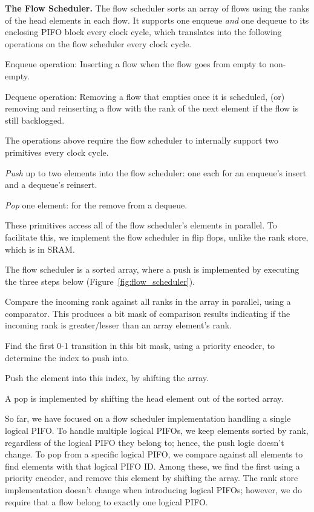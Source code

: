 \medskip
\noindent
\textbf{The Flow Scheduler.}
The flow scheduler sorts an array of flows using the ranks of the head elements
in each flow. It supports one enqueue {\em and} one dequeue to its enclosing
PIFO block every clock cycle, which translates into the following operations on
the flow scheduler every clock cycle.
\begin{CompactEnumerate}
  \item Enqueue operation: Inserting a flow when the flow goes from empty to
  non-empty.
\item Dequeue operation: Removing a flow that empties once it is
  scheduled, (or) removing and reinserting a flow with the rank of the
  next element if the flow is still backlogged.
\end{CompactEnumerate}

The operations above require the flow scheduler to internally support two
primitives every clock cycle.
\begin{CompactEnumerate}
\item {\em Push} up to two elements into the flow scheduler: one each for an
  enqueue's insert and a dequeue's reinsert.
\item {\em Pop} one element: for the remove from a dequeue.
\end{CompactEnumerate}
These primitives access all of the flow scheduler's elements in parallel. To
facilitate this, we implement the flow scheduler in flip flops, unlike the rank
store, which is in SRAM.

The flow scheduler is a sorted array, where a push is implemented by executing the
three steps below (Figure~\ref{fig:flow_scheduler}).
\begin{CompactEnumerate}
\item Compare the incoming rank against all ranks in the array in parallel, using a comparator.
  This produces a bit mask of comparison results indicating if the incoming rank
  is greater/lesser than an array element's rank.
\item Find the first 0-1 transition in this bit mask, using a priority encoder,
  to determine the index to push into.
\item Push the element into this index, by shifting the array.
\end{CompactEnumerate}
A pop is implemented by shifting the head element out of the sorted array.

So far, we have focused on a flow scheduler implementation handling a single
logical PIFO. To handle multiple logical PIFOs, we keep elements sorted by
rank, regardless of the logical PIFO they belong to; hence, the push logic
doesn't change.  To pop from a specific logical PIFO, we compare against all elements to
find elements with that logical PIFO ID. Among these, we find the first
using a priority encoder, and remove this element by shifting the array. The
rank store implementation doesn't change when introducing logical PIFOs;
however, we do require that a flow belong to exactly one logical PIFO.

